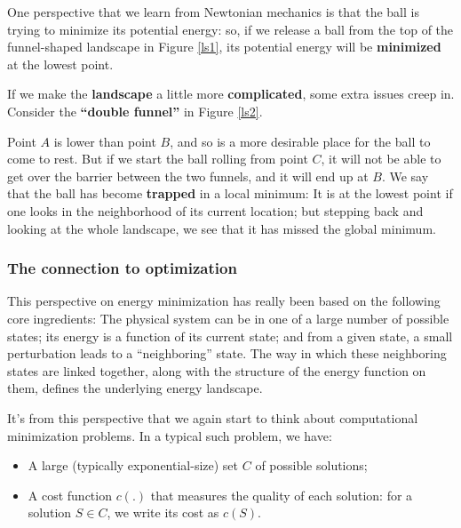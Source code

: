 \label{ls1}

One perspective that we learn from Newtonian mechanics is that the ball is trying to minimize its potential energy: so, if we release a ball from the top of the funnel-shaped landscape in Figure \ref{ls1}, its potential energy will be \textbf{minimized} at the lowest point. 

If we make the \textbf{landscape} a little more \textbf{complicated}, some extra issues creep in. Consider the \textbf{“double funnel”} in Figure \ref{ls2}. 


Point $A$ is lower than point $B$, and so is a more desirable place for the ball to come to rest. But if we start the ball rolling from point $C$, it will not be able to get over the barrier between the two funnels, and it will end up at $B$. We say that the ball has become \textbf{trapped} in a local minimum\textbf{}: It is at the lowest point if one looks in the neighborhood of its current location; but stepping back and looking at the whole landscape, we see that it has missed the global minimum.

\subsubsection{The connection to optimization}
This perspective on energy minimization has really been based on the following core ingredients: The physical system can be in one of a large number of possible states; its energy is a function of its current state; and from a given state, a small perturbation leads to a “neighboring” state. The way in which these neighboring states are linked together, along with the structure of the energy function on them, defines the underlying energy landscape. 

It’s from this perspective that we again start to think about computational minimization problems. In a typical such problem, we have:

\begin{itemize}
    \item A large (typically exponential-size) set $C$ of possible solutions;
    \item A cost function $c(.)$ that measures the quality of each solution: for a solution $S \in C$, we write its cost as $c(S)$.
\end{itemize}

